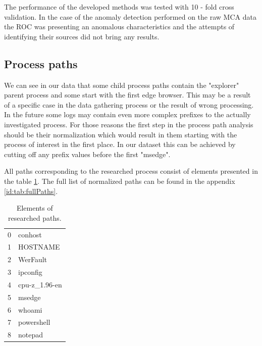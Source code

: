 \documentclass[a4paper,twoside,12pt]{book}
\begin{document}
The performance of the developed methods was tested with 10 - fold cross validation. In the case of
the anomaly detection performed on the raw MCA data the ROC was presenting an anomalous characteristics 
and the attempts of identifying their sources did not bring any results.

\subsection{Process paths}

We can see in our data that some child process paths contain the "explorer" parent process and some start with the first 
edge browser. This may be a result of a specific case in the data gathering process or the result of wrong 
processing. In the future some logs may contain even more complex prefixes to the actually investigated
process. For those reasons the first step in the process path analysis should be their normalization which
would result in them starting with the process of interest in the first place. In our dataset this can 
be achieved by cutting off any prefix values before the first "msedge".  

All paths corresponding to the researched process consist of elements presented in the table 
\ref{id:tab:pathElems}. The full list of normalized paths can be found in the appendix \ref{id:tab:fullPaths}.

\begin{table}
\centering
\caption{Elements of researched paths.}
\label{id:tab:pathElems}
\begin{tabular}{ll}
	\toprule
	0 &        conhost \\
	1 &       HOSTNAME \\
	2 &       WerFault \\
	3 &       ipconfig \\
	4 &  cpu-z\_1.96-en \\
	5 &         msedge \\
	6 &         whoami \\
	7 &     powershell \\
	8 &        notepad \\
	\bottomrule
\end{tabular}
\end{table}		
	
\end{document}
